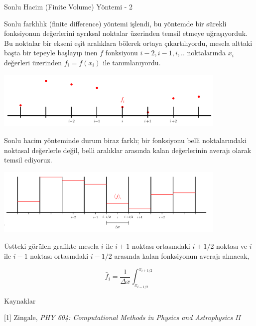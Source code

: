 \documentclass[12pt,fleqn]{article}\usepackage{../../common}
\begin{document}
Sonlu Hacim (Finite Volume) Yöntemi - 2

Sonlu farklılık (finite difference) yöntemi işlendi, bu yöntemde bir sürekli
fonksiyonun değerlerini ayrıksal noktalar üzerinden temsil etmeye uğraşıyorduk.
Bu noktalar bir ekseni eşit aralıklara bölerek ortaya çıkartılıyordu, mesela
alttaki başta bir tepeyle başlayıp inen $f$ fonksiyonu $i-2,i-1,i,..$
noktalarında $x_i$ değerleri üzerinden $f_i = f(x_i)$ ile tanımlanıyordu.

\includegraphics[width=30em]{13-22-29.png}

Sonlu hacim yönteminde durum biraz farklı; bir fonksiyonu belli noktalarındaki
noktasal değerlerle değil, belli aralıklar arasında kalan değerlerinin averajı
olarak temsil ediyoruz.

\includegraphics[width=30em]{13-22-34.png}

Üstteki görülen grafikte mesela $i$ ile $i+1$ noktası ortasındaki $i+1/2$
noktası ve $i$ ile $i-1$ noktası ortasındaki $i-1/2$ arasında kalan fonksiyonun
averajı alınacak,

$$
\bar{f}_i = \frac{1}{\Delta x} \int _{x_{i-1/2}}^{x_{i+1/2}}
$$







Kaynaklar

[1] Zingale, {\em PHY 604: Computational Methods in Physics and Astrophysics II}
\end{document}
